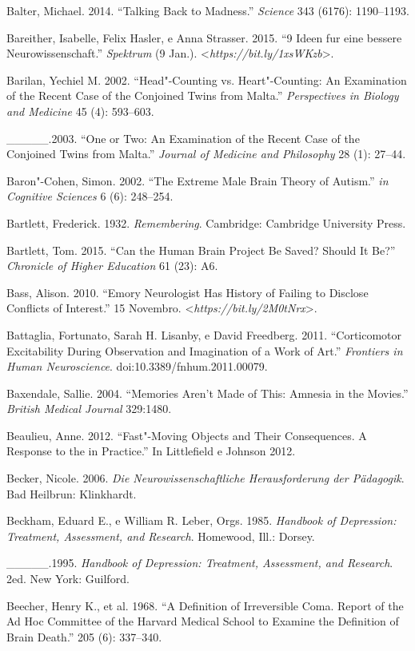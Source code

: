 {\begin{Parskip}
Balter, Michael. 2014. ``Talking Back to Madness.'' \emph{Science} 343
(6176): 1190--1193.

Bareither, Isabelle, Felix Hasler, e Anna Strasser. 2015. ``9 Ideen fur
eine bessere Neurowissenschaft.'' \emph{Spektrum} (9 Jan.).
\textless{}\emph{https://bit.ly/1xsWKzb}\textgreater{}.

Barilan, Yechiel M. 2002. ``Head"-Counting vs. Heart"-Counting: An
Examination of the Recent Case of the Conjoined Twins from Malta.''
\emph{Perspectives in Biology and Medicine} 45 (4): 593--603.

\_\_\_\_\_.2003. ``One or Two: An Examination of the Recent Case of the
Conjoined Twins from Malta.'' \emph{Journal of Medicine and Philosophy}
28 (1): 27--44.

Baron"-Cohen, Simon. 2002. ``The Extreme Male Brain Theory of Autism.''
\emph{ in Cognitive Sciences} 6 (6): 248--254.

Bartlett, Frederick. 1932. \emph{Remembering}. Cambridge: Cambridge
University Press.

Bartlett, Tom. 2015. ``Can the Human Brain Project Be Saved? Should It
Be?'' \emph{Chronicle of Higher Education} 61 (23): A6.

Bass, Alison. 2010. ``Emory Neurologist Has History of Failing to
Disclose Conflicts of Interest.'' 15 Novembro.
\textless{}\emph{https://bit.ly/2M0tNrx}\textgreater{}.

Battaglia, Fortunato, Sarah H. Lisanby, e David Freedberg. 2011.
``Corticomotor Excitability During Observation and Imagination of a Work
of Art.'' \emph{Frontiers in Human Neuroscience}.
doi:10.3389/fnhum.2011.00079.

Baxendale, Sallie. 2004. ``Memories Aren't Made of This: Amnesia in the
Movies.'' \emph{British Medical Journal} 329:1480.

Beaulieu, Anne. 2012. ``Fast"-Moving Objects and Their Consequences. A
Response to the  in Practice.'' In Littlefield e Johnson 2012.

Becker, Nicole. 2006. \emph{Die Neurowissenschaftliche Herausforderung
der Pädagogik}. Bad Heilbrun: Klinkhardt.

Beckham, Eduard E., e William R. Leber, Orgs. 1985. \emph{Handbook of
Depression: Treatment, Assessment, and Research}. Homewood, Ill.:
Dorsey.

\_\_\_\_\_.1995. \emph{Handbook of Depression: Treatment, Assessment, and
Research}. 2ed. New York: Guilford.

Beecher, Henry K., et al. 1968. ``A Definition of Irreversible Coma.
Report of the Ad Hoc Committee of the Harvard Medical School to Examine
the Definition of Brain Death.'' \emph{} 205 (6): 337--340.


\end{Parskip}}
